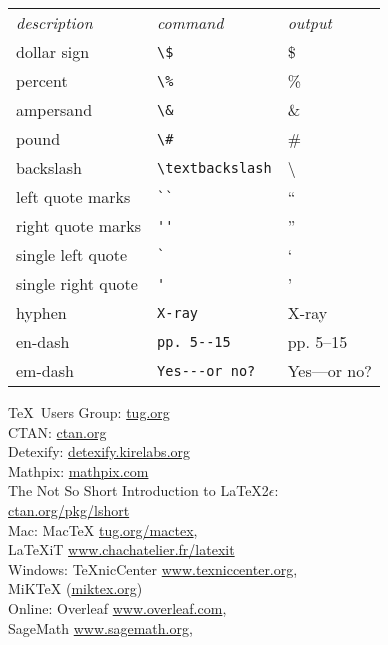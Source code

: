 \documentclass[10pt,landscape]{article}
\begin{document}
\begin{multicols}{3}
\begin{tabular}{lll}
\emph{description} & \emph{command} & \emph{output}\\
dollar sign & \verb!\$! & \$ \\
percent & \verb!\%! & \% \\
ampersand & \verb!\&! & \& \\
pound & \verb!\#! & \# \\
backslash & \verb!\textbackslash! & \textbackslash \\
left quote marks & \verb!``! & `` \\
right quote marks & \verb!''! & '' \\
single left quote  & \verb!`! & ` \\
single right quote  & \verb!'! & ' \\
hyphen & \verb!X-ray! & X-ray\\
en-dash & \verb!pp. 5--15! & pp. 5--15 \\
em-dash & \verb!Yes---or no?! & Yes---or no? 
\end{tabular}

\begin{tcolorbox}[resourcebox, title=Resources]
\small
\TeX\ Users Group: \url{tug.org}\\
CTAN: \url{ctan.org}\\
Detexify: \url{detexify.kirelabs.org}\\
Mathpix: \url{mathpix.com}\\
The Not So Short Introduction to LaTeX2\(\epsilon\):\\ \hspace*{2em}\url{ctan.org/pkg/lshort}\\
Mac: MacTeX \url{tug.org/mactex},\\ \hspace*{2em}LaTeXiT \url{www.chachatelier.fr/latexit}\\
Windows: TeXnicCenter \url{www.texniccenter.org},\\ \hspace*{2em}MiKTeX (\url{miktex.org})\\
Online: Overleaf \url{www.overleaf.com},\\ \hspace*{2em}SageMath \url{www.sagemath.org},\\
\end{tcolorbox}
\end{multicols}
\end{document}
